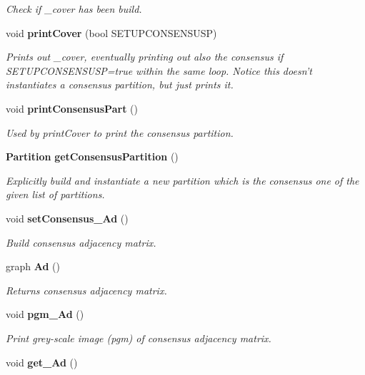 \begin{CompactItemize}
\begin{CompactList}\small\item\em Check if \_\-cover has been build. \item\end{CompactList}\item 
void {\bf print\-Cover} (bool SETUPCONSENSUSP)
\begin{CompactList}\small\item\em Prints out \_\-cover, eventually printing out also the consensus if SETUPCONSENSUSP=true within the same loop. Notice this doesn't instantiates a consensus partition, but just prints it. \item\end{CompactList}\item 
void {\bf print\-Consensus\-Part} ()\label{classPartitionStats_a11}

\begin{CompactList}\small\item\em Used by print\-Cover to print the consensus partition. \item\end{CompactList}\item 
{\bf Partition} {\bf get\-Consensus\-Partition} ()
\begin{CompactList}\small\item\em Explicitly build and instantiate a new partition which is the consensus one of the given list of partitions. \item\end{CompactList}\item 
void {\bf set\-Consensus\_\-Ad} ()\label{classPartitionStats_a13}

\begin{CompactList}\small\item\em Build consensus adjacency matrix. \item\end{CompactList}\item 
graph {\bf Ad} ()\label{classPartitionStats_a14}

\begin{CompactList}\small\item\em Returns consensus adjacency matrix. \item\end{CompactList}\item 
void {\bf pgm\_\-Ad} ()\label{classPartitionStats_a15}

\begin{CompactList}\small\item\em Print grey-scale image (pgm) of consensus adjacency matrix. \item\end{CompactList}\item 
void {\bf get\_\-Ad} ()\label{classPartitionStats_a16}


\end{CompactItemize}
